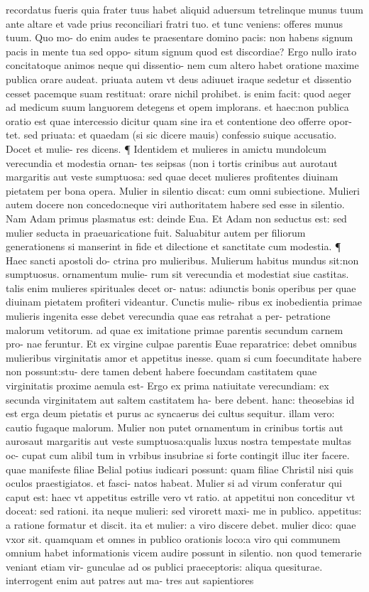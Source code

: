 \documentclass{article}
\begin{document}
\begin{pages}
\marginpar{[ p.2 ]}\pstart recordatus fueris quia frater tuus habet aliquid aduersum tetrelinque munus tuum ante altare et vade prius reconciliari fratri tuo. et tunc veniens: offeres munus tuum. Quo mo- do enim audes te praesentare domino pacis: non habens signum pacis in mente tua sed oppo- situm signum quod est discordiae? Ergo nullo irato concitatoque animos neque qui dissentio- nem cum altero habet oratione maxime publica orare audeat. priuata autem vt deus adiuuet iraque sedetur et dissentio cesset pacemque suam restituat: orare nichil prohibet. is enim facit: quod aeger ad medicum suum languorem detegens et opem implorans. et haec:non publica oratio est quae intercessio dicitur quam sine ira et contentione deo offerre opor- tet. sed priuata: et quaedam (si sic dicere mauis) confessio suique accusatio. Docet et mulie-  res dicens. ¶ Identidem et mulieres in amictu mundolcum verecundia et modestia ornan-  tes seipsas (non i tortis crinibus aut aurotaut margaritis aut veste sumptuosa: sed quae  decet mulieres profitentes diuinam pietatem per bona opera. Mulier in silentio discat:  cum omni subiectione. Mulieri autem docere non concedo:neque viri authoritatem habere   sed esse in silentio. Nam Adam primus plasmatus est: deinde Eua. Et Adam non seductus  est: sed mulier seducta in praeuaricatione fuit. Saluabitur autem per filiorum generationens  si manserint in fide et dilectione et sanctitate cum modestia. ¶ Haec sancti apostoli do- ctrina pro mulieribus. Mulierum habitus mundus sit:non sumptuosus. ornamentum mulie- rum sit verecundia et modestiat siue castitas. talis enim mulieres spirituales decet or- natus: adiunctis bonis operibus per quae diuinam pietatem profiteri videantur. Cunctis mulie- ribus ex inobedientia primae mulieris ingenita esse debet verecundia quae eas retrahat a per- petratione malorum vetitorum. ad quae ex imitatione primae parentis secundum carnem pro- nae feruntur. Et ex virgine culpae parentis Euae reparatrice: debet omnibus mulieribus virginitatis amor et appetitus inesse. quam si cum foecunditate habere non possunt:stu- dere tamen debent habere foecundam castitatem quae virginitatis proxime aemula est- Ergo ex prima natiuitate verecundiam: ex secunda virginitatem aut saltem castitatem ha- bere debent. hanc: theosebias id est erga deum pietatis et purus ac syncaerus dei cultus sequitur. illam vero: cautio fugaque malorum. Mulier non putet ornamentum in crinibus tortis aut aurosaut margaritis aut veste sumptuosa:qualis luxus nostra tempestate multas oc- cupat cum alibil tum in vrbibus insubriae si forte contingit illuc iter facere. quae manifeste filiae Belial potius iudicari possunt: quam filiae Christil nisi quis oculos praestigiatos. et fasci- natos habeat. Mulier si ad virum conferatur qui caput est: haec vt appetitus estrille vero vt ratio. at appetitui non conceditur vt doceat: sed rationi. ita neque mulieri: sed virorett maxi- me in publico. appetitus: a ratione formatur et discit. ita et mulier: a viro discere debet. mulier dico: quae vxor sit. quamquam et omnes in publico orationis loco:a viro qui communem omnium habet informationis vicem audire possunt in silentio. non quod temerarie veniant etiam vir- gunculae ad os publici praeceptoris: aliqua quesiturae. interrogent enim aut patres aut ma- tres aut sapientiores 
\end{pages}
\end{document}
